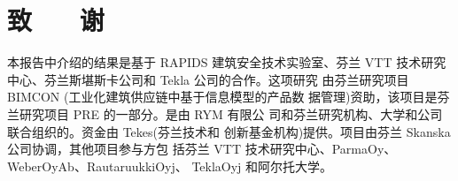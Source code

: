 \section*{致 ~~ 谢}
本报告中介绍的结果是基于 RAPIDS 建筑安全技术实验室、芬兰
VTT 技术研究中心、芬兰斯堪斯卡公司和 Tekla 公司的合作。这项研究
由芬兰研究项目 BIMCON (工业化建筑供应链中基于信息模型的产品数
据管理)资助，该项目是芬兰研究项目 PRE 的一部分。是由 RYM 有限公
司和芬兰研究机构、大学和公司联合组织的。资金由 Tekes(芬兰技术和
创新基金机构)提供。项目由芬兰 Skanska 公司协调，其他项目参与方包
括芬兰 VTT 技术研究中心、ParmaOy、WeberOyAb、RautaruukkiOyj、
TeklaOyj 和阿尔托大学。